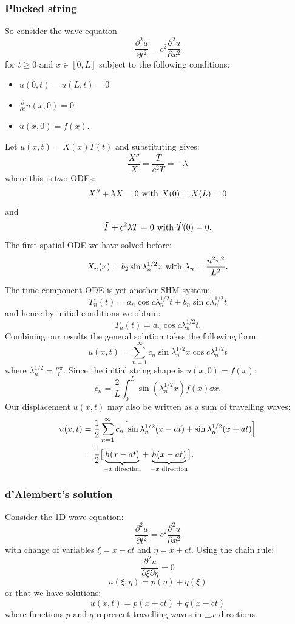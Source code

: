 \documentclass{article}
\begin{document}
\subsubsection{Plucked string}
So consider the wave equation
$$\frac{\partial^2u}{\partial t^2}=c^2\frac{\partial^2u}{\partial x^2}$$
for $t\geq0$ and $x\in[0,L]$ subject to the following conditions:
\begin{itemize}
    \item $u(0,t)=u(L,t)=0$
    \item $\displaystyle\frac{\partial}{\partial t}
    u(x,0)=0$
    \item $u(x,0)=f(x)$.
\end{itemize}
Let $u(x,t)=X(x)T(t)$ and substituting gives:
$$\frac{X''}{X}=\frac{\ddot{T}}{c^2 T}=-\lambda$$
where this is two ODEs:
$$X''+\lambda X=0
\hspace{0.05in}\text{with}\hspace{0.05in}
X(0)=X(L)=0$$
and
$$\ddot{T}+c^2\lambda T=0
\hspace{0.05in}\text{with}\hspace{0.05in}
\dot{T}(0)=0.$$
The first spatial ODE we have solved before:
$$X_n(x)=b_2\sin\lambda_n^{1/2}x
\hspace{0.05in}\text{with}\hspace{0.05in}
\lambda_n=\frac{n^2\pi^2}{L^2}.$$

\newpage

The time component ODE is yet another SHM system:
$$T_n(t)=a_n\cos c\lambda_n^{1/2}t
+b_n\sin c\lambda_n^{1/2}t$$
and hence by initial conditions we obtain:
$$T_n(t)=a_n\cos c\lambda_n^{1/2}t.$$
Combining our results the general solution takes the following form:
$$u(x,t)=\sum_{n=1}^{\infty}c_n\sin\lambda_n^{1/2}x
\cos c\lambda_n^{1/2}t$$
where $\lambda_n^{1/2}=\displaystyle\frac{n\pi}{L}$.
Since the initial string shape is
$u(x,0)=f(x)$:
$$c_n=\frac{2}{L}\int_{0}^{L}
\sin(\lambda_n^{1/2}x) f(x)\dd x.$$
Our displacement $u(x,t)$ may also be written as
a sum of travelling waves:
\begin{align*}
    u(x,t)
    &=\frac{1}{2}\sum_{n=1}^{\infty}c_n
    \Bigl[\sin\lambda_n^{1/2}(x-at)
    +\sin\lambda_n^{1/2}(x+at)\Bigr] \\
    &=\frac{1}{2}\bigl[\underbrace{h(x-at)}_\text{$+x$ direction}
    +\underbrace{h(x-at)}_\text{$-x$ direction}\bigr].
\end{align*}

\subsubsection{d'Alembert's solution}
Consider the 1D wave equation:
$$\frac{\partial^2u}{\partial t^2}=c^2\frac{\partial^2u}{\partial x^2}$$
with change of variables $\xi=x-ct$ and $\eta=x+ct$.
Using the chain rule:
$$\frac{\partial^2u}{\partial\xi\partial\eta}=0$$
$$u(\xi,\eta)=p(\eta)+q(\xi)$$
or that we have solutions:
$$u(x,t)=p(x+ct)+q(x-ct)$$
where functions $p$ and $q$ represent travelling waves in
$\pm x$ directions.
\end{document}
